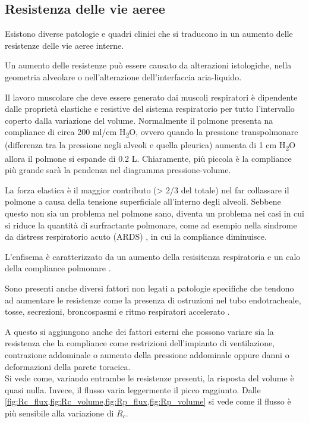 \subsection{Resistenza delle vie aeree}

Esistono diverse patologie e quadri clinici che si traducono in un aumento delle resistenze delle vie aeree interne. 

Un aumento delle resistenze può essere causato da alterazioni istologiche, nella geometria alveolare o nell'alterazione dell'interfaccia aria-liquido.

Il lavoro muscolare che deve essere generato dai muscoli respiratori è dipendente dalle proprietà elastiche e resistive del sistema respiratorio per tutto l'intervallo coperto dalla variazione del volume. Normalmente il polmone presenta na compliance di circa 200 ml/cm H\textsubscript{2}O, ovvero quando la pressione transpolmonare (differenza tra la pressione negli alveoli e quella pleurica) aumenta di 1 cm H\textsubscript{2}O allora il polmone si espande di 0.2 L. Chiaramente, più piccola è la compliance più grande sarà la pendenza nel diagramma pressione-volume. 

La forza elastica è il maggior contributo (> 2/3 del totale) nel far collassare il polmone a causa della tensione superficiale all'interno degli alveoli. Sebbene questo non sia un problema nel polmone sano, diventa un problema nei casi in cui si riduce la quantità di surfractante polmonare, come ad esempio nella sindrome da distress respiratorio acuto (ARDS) \cite{milic-emili_basics_1999}, in cui la compliance diminuisce. 

L'enfisema è caratterizzato da un aumento della resisitenza respiratoria e un calo della compliance polmonare \cite{milic-emili_basics_1999}.

Sono presenti anche diversi fattori non legati a patologie specifiche che tendono ad aumentare le resistenze come la presenza di ostruzioni nel tubo endotracheale, tosse, secrezioni, broncospasmi e ritmo respiratori accelerato \cite{grossbach_overview_2011}.

A questo si aggiungono anche dei fattori esterni che possono variare sia la resistenza che la compliance come restrizioni dell'impianto di ventilazione, contrazione addominale o aumento della pressione addominale oppure danni o deformazioni della parete toracica.
\\

Si vede come, variando entrambe le resistenze presenti, la risposta del volume è quasi nulla. Invece, il flusso varia leggermente il picco raggiunto. Dalle \cref{fig:Rc_flux,fig:Rc_volume,fig:Rp_flux,fig:Rp_volume} si vede come il flusso è più sensibile alla variazione di $R_c$.

